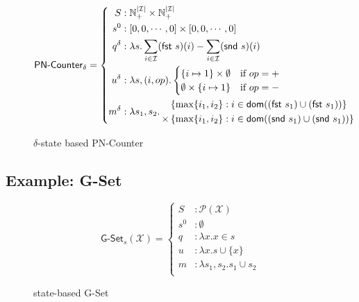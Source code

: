 \begin{figure}[H]
  \[
    \textsf{PN-Counter}_\delta = \left\{\begin{aligned}
      S &: \mathbb{N}_+^{|\mathcal{I}|} \times \mathbb{N}_+^{|\mathcal{I}|} \\
      s^0 &: \left[ 0, 0, \cdots, 0 \right] \times \left[ 0, 0, \cdots, 0 \right] \\
      q^\delta &: \lambda s. \sum_{i \in \mathcal{I}} (\textsf{fst}~s)(i) - \sum_{i \in
        \mathcal{I}} (\textsf{snd}~s)(i) \\
      u^\delta &: \lambda s,(i,op). \begin{cases}
             \{ i \mapsto 1 \} \times \emptyset & \text{if $op=+$} \\
             \emptyset \times \{ i \mapsto 1 \} & \text{if $op=-$} \\
           \end{cases} \\
      m^\delta &: \lambda s_1, s_2.\, \begin{aligned}
             &\left\{ \max\{ i_1, i_2 \} : i \in \mathsf{dom}((\textsf{fst}~s_1) \cup (\textsf{fst}~s_1)) \right\} \\
             \times &\left\{ \max\{ i_1, i_2 \} : i \in \mathsf{dom}((\textsf{snd}~s_1) \cup (\textsf{snd}~s_1)) \right\}
           \end{aligned}
    \end{aligned}\right.
  \]
  \caption{$\delta$-state based \textsf{PN-Counter} \CRDT}
\end{figure}


\subsection{Example: G-Set}
\label{sec:example-gset}


\begin{figure}[H]
  \centering
  \[
    \textsf{G-Set}_s(\mathcal{X}) = \left\{\begin{aligned}
      S &: \mathcal{P}(\mathcal{X}) \\
      s^0 &: \emptyset \\
      q &: \lambda x. x \in s \\
      u &: \lambda x. s \cup \{ x \} \\
      m &: \lambda s_1, s_2. s_1 \cup s_2 \\
    \end{aligned}\right.
  \]
  \caption{state-based \textsf{G-Set} \CRDT}
\end{figure}


